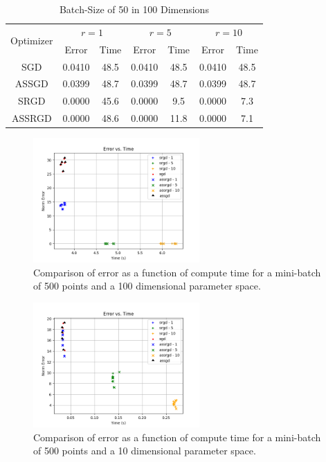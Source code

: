 \documentclass[,conference,compsoc]{IEEEtran}
\begin{document}
\begin{table}[!t]
\renewcommand{\arraystretch}{1.3}
\caption{Batch-Size of 50 in 100 Dimensions}
\label{tab:d100mb50}
\centering
\begin{tabular}{|c||c|c|c|c|c|c|}
\hline
\multirow{2}{*}{Optimizer} &
    \multicolumn{2}{c}{$r = 1$} &
    \multicolumn{2}{c}{$r = 5$} &
    \multicolumn{2}{c|}{$r = 10$}\\
    & Error & Time & Error & Time & Error & Time \\
    \hline
    SGD & 0.0410 & 48.5 & 0.0410 & 48.5 & 0.0410 & 48.5\\
    \hline
    ASSGD & 0.0399 & 48.7 & 0.0399 & 48.7 & 0.0399 & 48.7\\
    \hline
    SRGD & 0.0000 & 45.6 & 0.0000 & 9.5 & 0.0000 & 7.3\\
    \hline
    ASSRGD & 0.0000 & 48.6 & 0.0000 & 11.8 & 0.0000 & 7.1\\
\hline
\end{tabular}
\end{table}
\begin{figure}[!t]
    \centering
    \includegraphics[width=2.5in]{dim-100-batch-500}
    \caption{Comparison of error as a function of compute time for a mini-batch
    of 500 points and a 100 dimensional parameter space.}
    \label{fig:dim10}
\end{figure}
\begin{figure}[!t]
    \centering
    \includegraphics[width=2.5in]{dim-10-batch-500}
    \caption{Comparison of error as a function of compute time for a mini-batch
    of 500 points and a 10 dimensional parameter space.}
    \label{fig:dim10}
\end{figure}
\end{document}
